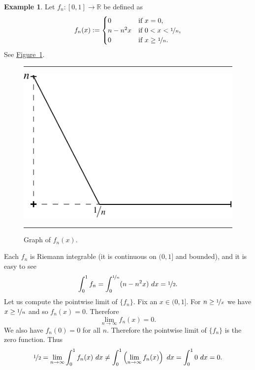 \documentclass[12pt]{book}
\newenvironment{myfigureht}{%
\begin{figure}[h!t]
\noindent\rule{\textwidth}{0.4pt}\vspace{12pt}\par\centering}%
{\par\noindent\rule{\textwidth}{0.4pt}
\end{figure}}
\newcommand{\R}{{\mathbb{R}}}
\theoremstyle{plain}
\theoremstyle{remark}
\theoremstyle{definition}
\theoremstyle{exercise}
\theoremstyle{example}
\newtheorem{example}[thm]{Example}
\newcommand{\figureref}[1]{\hyperref[#1]{Figure~\ref*{#1}}}
\begin{document}
\begin{example}
Let $f_n \colon [0,1] \to \R$
be defined as
\begin{equation*}
f_n(x) :=
\begin{cases}
0 &  \text{if $x = 0$,}\\
n-n^2x &  \text{if $0 < x < \nicefrac{1}{n}$,}\\
0 &  \text{if $x \geq \nicefrac{1}{n}$.}
\end{cases}
\end{equation*}
See \figureref{intconvcntr:fig}.

\begin{myfigureht}
\includegraphics{figures/intconvcntr}
\caption{Graph of $f_n(x)$.%
\label{intconvcntr:fig}}
\end{myfigureht}

Each $f_n$ is Riemann integrable (it is continuous on $(0,1]$ and bounded),
and it is easy to see
\begin{equation*}
\int_0^1 f_n =
\int_0^{\nicefrac{1}{n}} (n-n^2x)~dx = \nicefrac{1}{2} .
\end{equation*}
Let us compute the pointwise limit of $\{ f_n \}$.
Fix an $x \in (0,1]$.  For $n \geq \nicefrac{1}{x}$
we have $x \geq \nicefrac{1}{n}$ and so $f_n(x) = 0$.  Therefore
\begin{equation*}
\lim_{n \to \infty} f_n(x) = 0.
\end{equation*}
We also have $f_n(0) = 0$ for all $n$.  Therefore the pointwise
limit of $\{ f_n \}$ is the zero function.  Thus
\begin{equation*}
\nicefrac{1}{2} =
\lim_{n\to\infty}
\int_0^1 f_n (x)~dx
\not=
\int_0^1
\left(
\lim_{n\to\infty}
f_n(x)\right)~dx
=
\int_0^1 0~dx = 0 .
\end{equation*}
\end{example}
\end{document}
